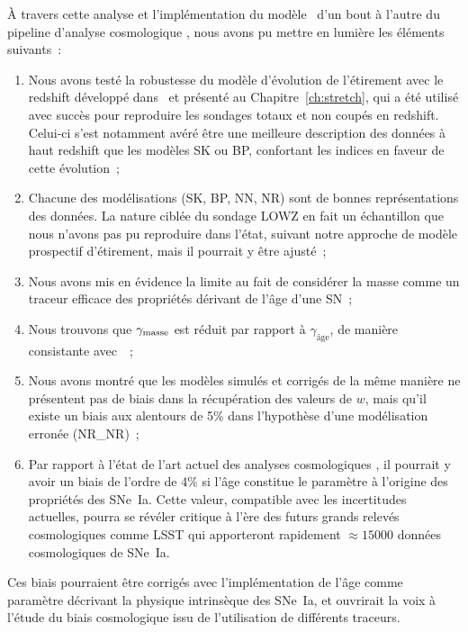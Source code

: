 \documentclass[../main/main.tex]{subfiles}
\begin{document}
À travers cette analyse et l'implémentation du modèle~
d'un bout à l'autre du pipeline d'analyse cosmologique \snana, nous
avons pu mettre en lumière les éléments suivants~:
\begin{enumerate}
    \item Nous avons testé la robustesse du modèle d'évolution de l'étirement
        avec le redshift développé dans~\cite{nicolas2021} et présenté au
        Chapitre~\ref{ch:stretch}, qui a été utilisé avec succès pour reproduire
        les sondages totaux et non coupés en redshift. Celui-ci s'est notamment
        avéré être une meilleure description des données à haut redshift que les
        modèles SK ou BP, confortant les indices en faveur de cette évolution~;
    \item Chacune des modélisations (SK, BP, NN, NR) sont de bonnes
        représentations des données. La nature ciblée du sondage LOWZ en fait
        un échantillon que nous n'avons pas pu reproduire dans l'état, suivant
        notre approche de modèle prospectif d'étirement, mais il pourrait y être
        ajusté~;
    \item Nous avons mis en évidence la limite au fait de considérer la masse
        comme un traceur efficace des propriétés dérivant de l'âge d'une SN~;
    \item Nous trouvons que $\gamma_{\rm masse}$ est réduit par rapport à
        $\gamma_\text{âge}$, de manière consistante avec~\cite{briday2022}~;
    \item Nous avons montré que les modèles simulés et corrigés de la même
        manière ne présentent pas de biais dans la récupération des valeurs de
        $w$, mais qu'il existe un biais aux alentours de 5\% dans l'hypothèse
        d'une modélisation erronée (NR\_NR)~;
    \item Par rapport à l'état de l'art actuel des analyses cosmologiques
        , il pourrait y avoir un biais de l'ordre de
        4\% si l'âge constitue le paramètre à l'origine des propriétés des
        SNe~Ia. Cette valeur, compatible avec les incertitudes actuelles, pourra
        se révéler critique à l'ère des futurs grands relevés cosmologiques
        comme LSST qui apporteront rapidement $\approx \num{15000}$ données
        cosmologiques de SNe~Ia.
\end{enumerate}

Ces biais pourraient être corrigés avec l'implémentation de l'âge comme
paramètre décrivant la physique intrinsèque des SNe~Ia, et ouvrirait la voix à
l'étude du biais cosmologique issu de l'utilisation de différents traceurs.

% 
% 
\end{document}
